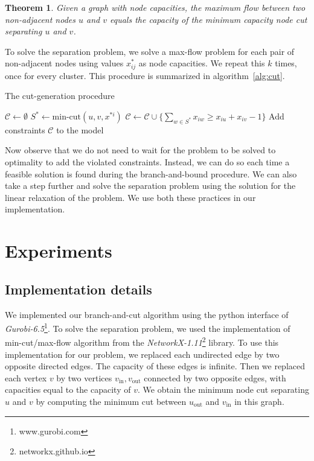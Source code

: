 \documentclass[conference,compsoc]{IEEEtran}
\newtheorem{theorem}{Theorem}
\begin{document}
\begin{theorem}
Given a graph with node capacities, the maximum flow between
two non-adjacent nodes $u$ and $v$ equals the capacity of the minimum
capacity node cut separating $u$ and $v$.
\end{theorem}

To solve the separation problem, we solve a max-flow problem for each
pair of non-adjacent nodes using values $x^*_{ij}$ as node capacities. We repeat this $k$ times, once for every cluster. This procedure is summarized in algorithm~\ref{alg:cut}.

\begin{algorithm}
\centering
\caption{The cut-generation procedure}
\label{alg:cut}
\begin{algorithmic}[1]
\State $\mathcal{C} \gets \emptyset$
		\State $S^* \gets \text{min-cut}(u, v, x^{*i})$ 
			\State $\mathcal{C} \gets \mathcal{C} \cup \{\sum_{w \in S^*} x_{iw} \geq x_{iu} + x_{iv} - 1\}$ 
		\EndIf
	\EndFor
\EndFor
\State Add constraints $\mathcal{C}$ to the model
\end{algorithmic}
\end{algorithm}

Now observe that we do not need to wait for the problem to be solved to
optimality to add the violated constraints. Instead, we can do so each
time a feasible solution is found during the branch-and-bound procedure.
We can also take a step further and solve the separation problem using
the solution for the linear relaxation of the problem. We use both these
practices in our implementation.

\section{Experiments}
\label{sec:experiments}

\subsection{Implementation details}
We implemented our branch-and-cut algorithm using the python interface
of \emph{Gurobi-6.5}\footnote{www.gurobi.com}. To solve the separation problem, we used the
implementation of min-cut/max-flow algorithm from the \emph{NetworkX-1.11}\footnote{networkx.github.io} library. To use this implementation for our problem, we replaced
each undirected edge by two opposite directed edges. The capacity of
these edges is infinite. Then we replaced each vertex $v$ by two
vertices $v_{\text{in}}, v_{\text{out}}$ connected by two opposite
edges, with capacities equal to the capacity of $v$. We obtain the
minimum node cut separating $u$ and $v$ by computing the minimum cut
between $u_{\text{out}}$ and $v_{\text{in}}$ in this graph.
\end{document}
